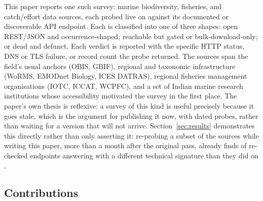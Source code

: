 This paper reports one such survey: \NSourcesSurveyed{} marine
biodiversity, fisheries, and catch/effort data sources, each probed live on
\ProbeDate{} against its documented or discoverable API endpoint. Each is
classified into one of three shapes: open REST/JSON and occurrence-shaped;
reachable but gated or bulk-download-only; or dead and defunct. Each verdict
is reported with the specific HTTP status, DNS or TLS failure, or record
count the probe returned. The sources span the field's usual anchors (OBIS, GBIF), regional
and taxonomic infrastructure (WoRMS, EMODnet Biology, ICES DATRAS), regional
fisheries management organisations (IOTC, ICCAT, WCPFC), and a set of Indian
marine research institutions whose accessibility motivated the survey in the
first place. The paper's own thesis is reflexive: a survey of this kind is
useful precisely because it goes stale, which is the argument for publishing
it now, with dated probes, rather than waiting for a version that will not
arrive. Section~\ref{sec:results} demonstrates this directly rather than only
asserting it: re-probing a subset of the \NSourcesSurveyed{} sources while
writing this paper, more than a month after the original pass, already finds
\NEndpointsDrifted{} of \NEndpointsReprobed{} re-checked endpoints answering
with a different technical signature than they did on \ProbeDate{}.

\subsection{Contributions}

